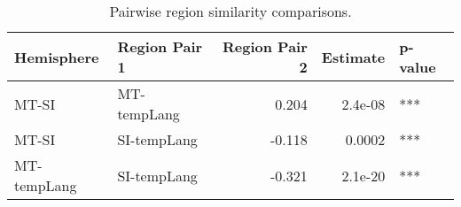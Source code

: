 \begin{table}[h]
\centering
\begin{tabular}{llrrl}
\toprule
 Hemisphere   & Region Pair 1   &   Region Pair 2 &   Estimate & p-value   \\
\midrule
 MT-SI        & MT-tempLang     &           0.204 &    2.4e-08 & ***       \\
 MT-SI        & SI-tempLang     &          -0.118 &    0.0002  & ***       \\
 MT-tempLang  & SI-tempLang     &          -0.321 &    2.1e-20 & ***       \\
\bottomrule
\end{tabular}
\caption{Pairwise region similarity comparisons.}
\end{table}